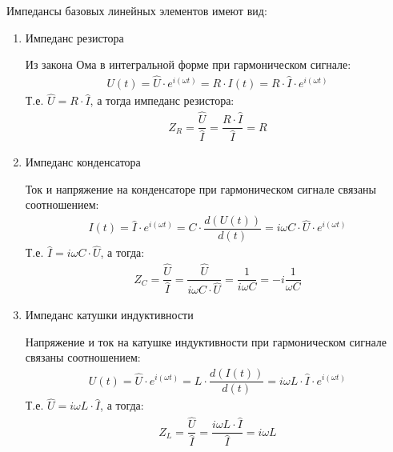 \documentclass[a4paper, usenames, dvipsnames]{article}
\begin{document}
Импедансы базовых линейных элементов имеют вид:
\begin{enumerate}
    \item Импеданс резистора

          Из закона Ома в интегральной форме при гармоническом сигнале:
          \begin{gather*}
              U(t) = \hat{U} \cdot e^{i(\omega t)} = R \cdot I(t) = R \cdot \hat{I} \cdot e^{i(\omega t)}
          \end{gather*}
          Т.е. $\hat{U} = R \cdot \hat{I}$, а тогда импеданс резистора:
          \begin{gather*}
              Z_R = \dfrac{\hat{U}}{\hat{I}} = \dfrac{R \cdot \hat{I}}{\hat{I}} = R
          \end{gather*}

    \item Импеданс конденсатора

          Ток и напряжение на конденсаторе при гармоническом сигнале связаны соотношением:
          \begin{gather*}
              I(t) = \hat{I} \cdot e^{i(\omega t)} = C \cdot \dfrac{d(U(t))}{d(t)} = i\omega C \cdot \hat{U} \cdot e^{i(\omega t)}
          \end{gather*}
          Т.е. $\hat{I} = i\omega C \cdot \hat{U}$, а тогда:
          \begin{gather*}
              Z_C = \dfrac{\hat{U}}{\hat{I}} = \dfrac{\hat{U}}{i\omega C \cdot \hat{U}} = \dfrac{1}{i\omega C} = -i\dfrac{1}{\omega C}
          \end{gather*}
    \item Импеданс катушки индуктивности

          Напряжение и ток на катушке индуктивности при гармоническом сигнале связаны соотношением:
          \begin{gather*}
              U(t) = \hat{U} \cdot e^{i(\omega t)} = L \cdot \dfrac{d(I(t))}{d(t)} = i\omega L \cdot \hat{I} \cdot e^{i(\omega t)}
          \end{gather*}
          Т.е. $\hat{U} = i\omega L \cdot \hat{I}$, а тогда:
          \begin{gather*}
              Z_L = \dfrac{\hat{U}}{\hat{I}} = \dfrac{i\omega L \cdot \hat{I}}{\hat{I}} = i \omega L
          \end{gather*}
\end{enumerate}
\end{document}
